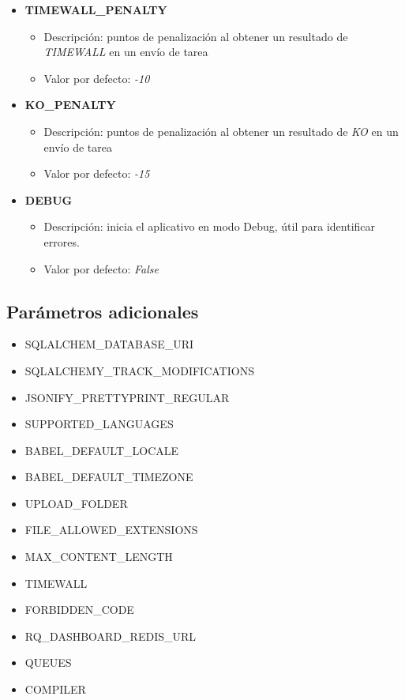 \documentclass[11pt,spanish,listoffigures,listoftables]{tfgetsinf}
\begin{document}
\begin{itemize}
	\item \textbf{TIMEWALL\_PENALTY}
	\begin{itemize}
		\item Descripción: puntos de penalización al obtener un resultado de \textit{TIMEWALL} en un envío de \Gls{tarea}
		\item Valor por defecto: \textit{-10}
	\end{itemize}
\end{itemize}

\begin{itemize}
	\item \textbf{KO\_PENALTY}
	\begin{itemize}
		\item Descripción: puntos de penalización al obtener un resultado de \textit{KO} en un envío de \Gls{tarea}
		\item Valor por defecto: \textit{-15}
	\end{itemize}
\end{itemize}

\begin{itemize}
	\item \textbf{DEBUG}
	\begin{itemize}
		\item Descripción: inicia el aplicativo en modo Debug, útil para identificar errores.
		\item Valor por defecto: \textit{False}
	\end{itemize}
\end{itemize}

\subsection*{Parámetros adicionales}

\begin{itemize}
	\item SQLALCHEM\_DATABASE\_URI
	\item SQLALCHEMY\_TRACK\_MODIFICATIONS
	\item JSONIFY\_PRETTYPRINT\_REGULAR
	\item SUPPORTED\_LANGUAGES
	\item BABEL\_DEFAULT\_LOCALE
	\item BABEL\_DEFAULT\_TIMEZONE
	\item UPLOAD\_FOLDER
	\item FILE\_ALLOWED\_EXTENSIONS
	\item MAX\_CONTENT\_LENGTH
	\item TIMEWALL
	\item FORBIDDEN\_CODE
	\item RQ\_DASHBOARD\_REDIS\_URL
	\item QUEUES
	\item COMPILER
\end{itemize}

\glsaddall
\printglossary[title=Acrónimos,type=\acronymtype]

\glsaddall
\printglossary[title=Términos,toctitle=Terms and abbreviations]
\end{document}
